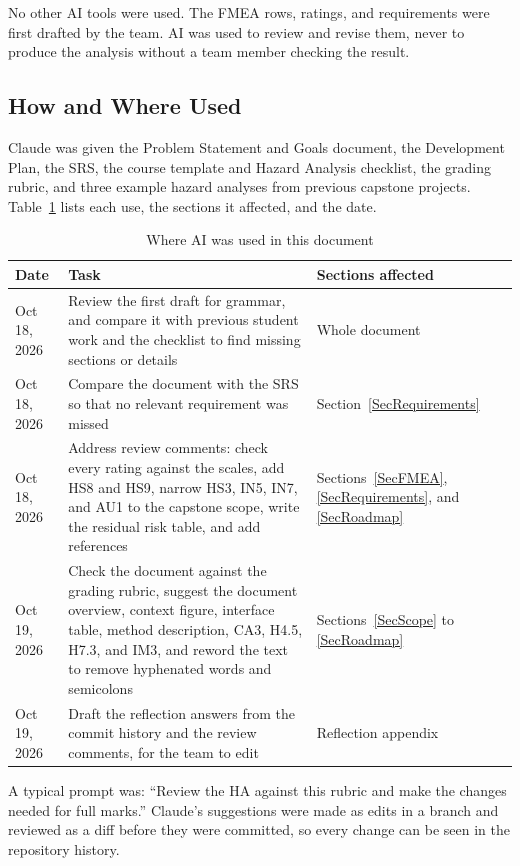\documentclass{article}
\begin{document}
No other AI tools were used. The FMEA rows, ratings, and requirements were
first drafted by the team. AI was used to review and revise them, never to
produce the analysis without a team member checking the result.

\subsection{How and Where Used}

Claude was given the Problem Statement and Goals document, the Development
Plan, the SRS, the course template and Hazard Analysis checklist, the grading
rubric, and three example hazard analyses from previous capstone projects.
Table~\ref{TblAIUse} lists each use, the sections it affected, and the date.

\begin{table}[h!]
\caption{Where AI was used in this document} \label{TblAIUse}
\small
\begin{tabularx}{\textwidth}{lXX}
\toprule
\textbf{Date} & \textbf{Task} & \textbf{Sections affected}\\
\midrule
Oct 18, 2026 & Review the first draft for grammar, and compare it with
previous student work and the checklist to find missing sections or details
& Whole document\\
Oct 18, 2026 & Compare the document with the SRS so that no relevant
requirement was missed & Section~\ref{SecRequirements}\\
Oct 18, 2026 & Address review comments: check every rating against the
scales, add HS8 and HS9, narrow HS3, IN5, IN7, and AU1 to the capstone scope,
write the residual risk table, and add references & Sections~\ref{SecFMEA},
\ref{SecRequirements}, and \ref{SecRoadmap}\\
Oct 19, 2026 & Check the document against the grading rubric, suggest the
document overview, context figure, interface table, method description, CA3,
H4.5, H7.3, and IM3, and reword the text to remove hyphenated words and
semicolons & Sections~\ref{SecScope} to \ref{SecRoadmap}\\
Oct 19, 2026 & Draft the reflection answers from the commit history and the
review comments, for the team to edit & Reflection appendix\\
\bottomrule
\end{tabularx}
\end{table}

A typical prompt was: ``Review the HA against this rubric and make the changes
needed for full marks.'' Claude's suggestions were made as edits in a branch
and reviewed as a diff before they were committed, so every change can be
seen in the repository history.
\end{document}
